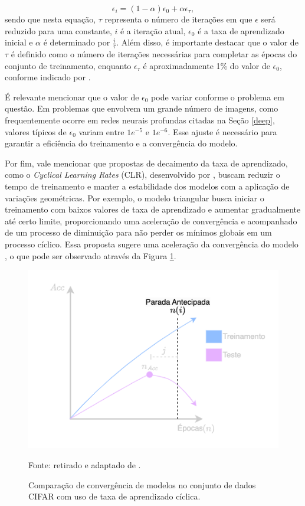 \begin{equation}
\label{deep:eq:dynamic_lr}
\epsilon_i = (1 - \alpha) \epsilon_0 + \alpha\epsilon_\tau,
\end{equation}
sendo que nesta equação, $\tau$ representa o número de iterações em que $\epsilon$ será reduzido para uma constante, $i$ é a iteração atual, $\epsilon_0$ é a taxa de aprendizado inicial e $\alpha$ é determinado por $\frac{i}{\tau}$. Além disso, é importante destacar que o valor de $\tau$ é definido como o número de iterações necessárias para completar as épocas do conjunto de treinamento, enquanto $\epsilon_\tau$ é aproximadamente 1\% do valor de $\epsilon_0$, conforme indicado por \cite{Goodfellow2016}.

É relevante mencionar que o valor de $\epsilon_0$ pode variar conforme o problema em questão. Em problemas que envolvem um grande número de imagens, como frequentemente ocorre em redes neurais profundas citadas na Seção \ref{deep}, valores típicos de $\epsilon_0$ variam entre $1e^{-5}$ e $1e^{-6}$. Esse ajuste é necessário para garantir a eficiência do treinamento e a convergência do modelo.

Por fim, vale mencionar que propostas de decaimento da taxa de aprendizado, como o \textit{Cyclical Learning Rates} (CLR), desenvolvido por \cite{Smith2017CyclicalNetworks}, buscam reduzir o tempo de treinamento e manter a estabilidade dos modelos com a aplicação de variações geométricas. Por exemplo, o modelo triangular busca iniciar o treinamento com baixos valores de taxa de aprendizado e aumentar gradualmente até certo limite, proporcionando uma aceleração de convergência e acompanhado de um processo de diminuição para não perder os mínimos globais em um processo cíclico. Essa proposta sugere uma aceleração da convergência do modelo \citep{Smith2017CyclicalNetworks}, o que pode ser observado através da Figura \ref{deep:optimization:cyclical_lr}.

\begin{figure}[H]
    \centering
    \caption{Comparação de convergência de modelos no conjunto de dados CIFAR \citep{Krizhevsky2014TheDataset} com uso de taxa de aprendizado cíclica.}
    \includegraphics[width=0.8\linewidth]{recursos/imagens/deep/early_stopping.png}
    \label{deep:optimization:cyclical_lr}

    Fonte: retirado e adaptado de \cite{Smith2017CyclicalNetworks}.
\end{figure}

